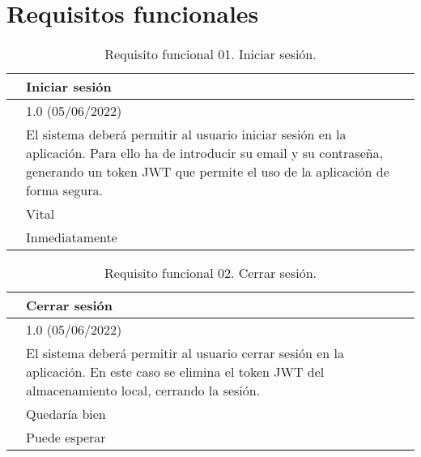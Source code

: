 \section{Requisitos funcionales}
\label{APRequisitosFuncionales}

\begin{table}[H]
\begin{center}
\begin{tabular}{|p{3cm}|p{10cm}|} \hline
\centering {\bf FRQ-01} & Iniciar sesión  \\ \hline\hline
\centering {\bf Versión} & 1.0 (05/06/2022) \\ \hline
\centering {\bf Descripción} & El sistema deberá permitir al usuario iniciar sesión en la aplicación. Para ello ha de introducir su email y su contraseña, generando un token JWT que permite el uso de la aplicación de forma segura. \\ \hline
\centering {\bf Importancia} & Vital \\ \hline
\centering {\bf Urgencia} & Inmediatamente \\ \hline
\end{tabular}
\caption{Requisito funcional 01. Iniciar sesión.}
\label{enlaceFRQ1}
\end{center}
\end{table}

\begin{table}[H]
\begin{center}
\begin{tabular}{|p{3cm}|p{10cm}|} \hline
\centering {\bf FRQ-02} & Cerrar sesión  \\ \hline\hline
\centering {\bf Versión} & 1.0 (05/06/2022) \\ \hline
\centering {\bf Descripción} & El sistema deberá permitir al usuario cerrar sesión en la aplicación. En este caso se elimina el token JWT del almacenamiento local, cerrando la sesión. \\ \hline
\centering {\bf Importancia} & Quedaría bien \\ \hline
\centering {\bf Urgencia} & Puede esperar \\ \hline
\end{tabular}
\caption{Requisito funcional 02. Cerrar sesión.}
\label{enlaceFRQ2}
\end{center}
\end{table}

